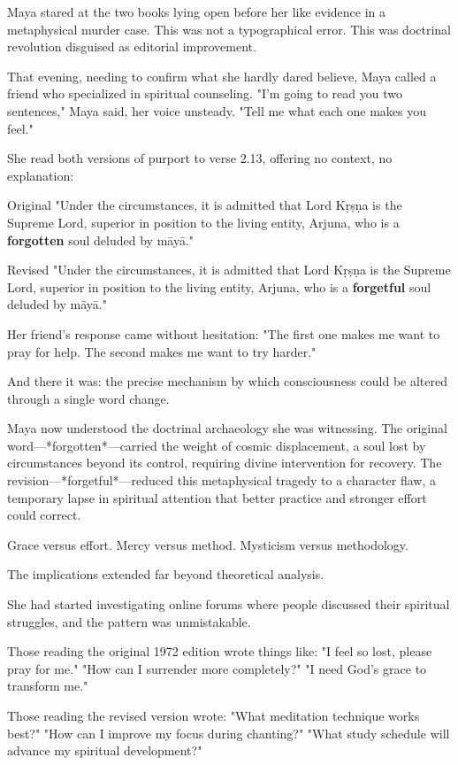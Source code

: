 \documentclass[12pt,twoside]{book}
\begin{document}
Maya stared at the two books lying open before her like evidence in a metaphysical murder case. This was not a typographical error. This was doctrinal revolution disguised as editorial improvement.

That evening, needing to confirm what she hardly dared believe, Maya called a friend who specialized in spiritual counseling. "I'm going to read you two sentences," Maya said, her voice unsteady. "Tell me what each one makes you feel."

She read both versions of purport to verse 2.13, offering no context, no explanation:

Original
"Under the circumstances, it is admitted that Lord Kṛṣṇa is the Supreme Lord, superior in position to the living entity, Arjuna, who is a \textbf{forgotten} soul deluded by māyā."

Revised
"Under the circumstances, it is admitted that Lord Kṛṣṇa is the Supreme Lord, superior in position to the living entity, Arjuna, who is a \textbf{forgetful} soul deluded by māyā."

Her friend's response came without hesitation: "The first one makes me want to pray for help. The second makes me want to try harder."

And there it was: the precise mechanism by which consciousness could be altered through a single word change.

Maya now understood the doctrinal archaeology she was witnessing. The original word—*forgotten*—carried the weight of cosmic displacement, a soul lost by circumstances beyond its control, requiring divine intervention for recovery. The revision—*forgetful*—reduced this metaphysical tragedy to a character flaw, a temporary lapse in spiritual attention that better practice and stronger effort could correct.

Grace versus effort. Mercy versus method. Mysticism versus methodology.

The implications extended far beyond theoretical analysis.

She had started investigating online forums where people discussed their spiritual struggles, and the pattern was unmistakable.

Those reading the original 1972 edition wrote things like: "I feel so lost, please pray for me." "How can I surrender more completely?" "I need God's grace to transform me."

Those reading the revised version wrote: "What meditation technique works best?" "How can I improve my focus during chanting?" "What study schedule will advance my spiritual development?"
\end{document}
